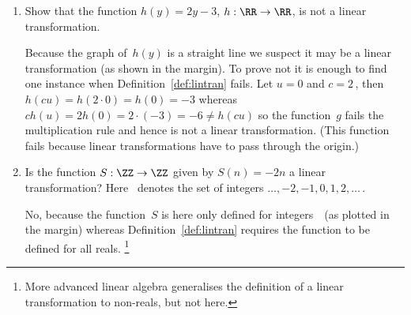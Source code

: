 \begin{example}[1D cases]
\begin{enumerate}
\item Show that the function \(h(y)=2y-3\), \(h:\RR\to\RR\), is not a linear transformation.
\begin{solution} 
Because the graph of~\(h(y)\) is a straight line we suspect it may be a linear transformation (as shown in the margin).
To prove not it is enough to find one instance when Definition~\ref{def:lintran} fails. 
Let \(u=0\) and \(c=2\)\,, then \(h(cu)=h(2\cdot0)=h(0)=-3\) whereas \(ch(u)=2h(0)=2\cdot(-3)=-6\neq h(cu)\) so the function~\(g\) fails the multiplication rule and hence is not a linear transformation.
(This function fails because linear transformations have to pass through the origin.)
\end{solution}

\item Is the function \(S:\ZZ\to\ZZ\) given by \(S(n)=-2n\) a linear transformation?  Here \ZZ~denotes the set of integers \(\ldots,-2,-1,0,1,2,\ldots\)\,.
\begin{solution} 
No, because the function~\(S\) is here only defined for integers~\ZZ\ (as plotted in the margin) whereas Definition~\ref{def:lintran} requires the function to be defined for all reals.
\footnote{More advanced linear algebra generalises the definition of a linear transformation to non-reals, but not here.}
\end{solution}

\end{enumerate}
\end{example}




